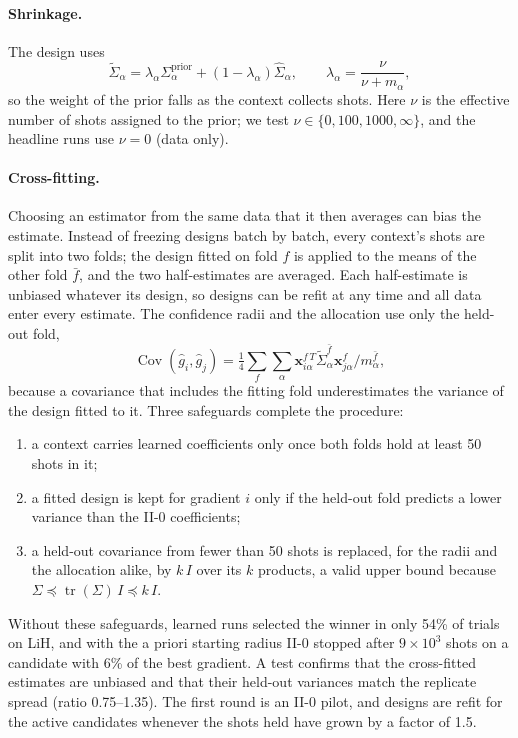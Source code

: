 \documentclass[aps,pra,reprint,superscriptaddress,nofootinbib]{revtex4-2}
\begin{document}
\paragraph{Shrinkage.} The design uses
\begin{equation}
\tilde\Sigma_\alpha=\lambda_\alpha\Sigma^{\mathrm{prior}}_\alpha+(1-\lambda_\alpha)\hat\Sigma_\alpha ,\qquad
\lambda_\alpha=\frac{\nu}{\nu+m_\alpha},
\end{equation}
so the weight of the prior falls as the context collects shots. Here $\nu$ is the effective number of shots assigned to the prior; we test $\nu\in\{0,100,1000,\infty\}$, and the headline runs use $\nu=0$ (data only).

\paragraph{Cross-fitting.} Choosing an estimator from the same data that it then averages can bias the estimate. Instead of freezing designs batch by batch, every context's shots are split into two folds; the design fitted on fold $f$ is applied to the means of the other fold $\bar f$, and the two half-estimates are averaged. Each half-estimate is unbiased whatever its design, so designs can be refit at any time and all data enter every estimate. The confidence radii and the allocation use only the held-out fold,
\begin{equation}
\operatorname{Cov}(\hat g_i,\hat g_j)=\tfrac14\sum_{f}\sum_\alpha\boldsymbol x^{f\,T}_{i\alpha}\tilde\Sigma^{\bar f}_\alpha\boldsymbol x^{f}_{j\alpha}/m^{\bar f}_\alpha ,
\end{equation}
because a covariance that includes the fitting fold underestimates the variance of the design fitted to it. Three safeguards complete the procedure:
\begin{enumerate}[label=(\roman*)]
\item a context carries learned coefficients only once both folds hold at least 50 shots in it;
\item a fitted design is kept for gradient $i$ only if the held-out fold predicts a lower variance than the II-0 coefficients;
\item a held-out covariance from fewer than 50 shots is replaced, for the radii and the allocation alike, by $k\,I$ over its $k$ products, a valid upper bound because $\Sigma\preceq\operatorname{tr}(\Sigma)\,I\preceq k\,I$.
\end{enumerate}
Without these safeguards, learned runs selected the winner in only 54\% of trials on LiH, and with the a priori starting radius II-0 stopped after $9\times10^3$ shots on a candidate with 6\% of the best gradient. A test confirms that the cross-fitted estimates are unbiased and that their held-out variances match the replicate spread (ratio 0.75--1.35). The first round is an II-0 pilot, and designs are refit for the active candidates whenever the shots held have grown by a factor of 1.5.
\end{document}
